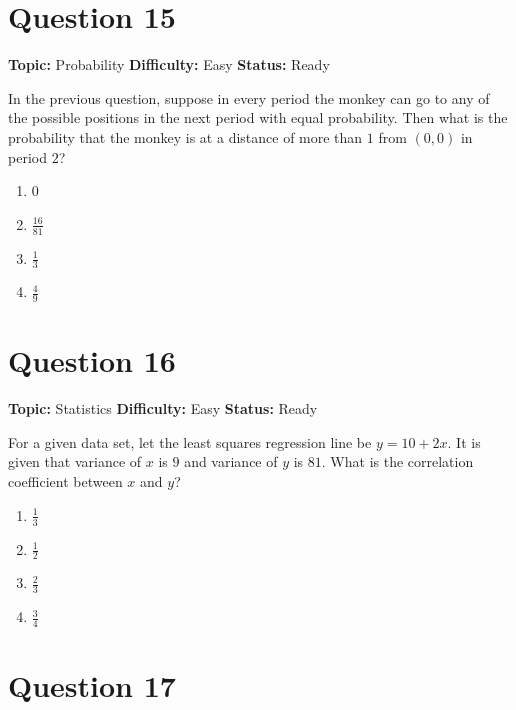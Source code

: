 \documentclass[11pt]{article}
\begin{document}
\newpage

\section*{Question 15}


\noindent\textbf{Topic:} Probability \quad \textbf{Difficulty:} Easy \quad \textbf{Status:} Ready



In the previous question, suppose in every period the monkey can go to any of the possible positions in the next period with equal probability. Then what is the probability that the monkey is at a distance of more than $1$ from $(0,0)$ in period $2$?
\begin{enumerate}[label=(\Alph*)]
\item $0$
\item $\tfrac{16}{81}$
\item $\tfrac{1}{3}$
\item $\tfrac{4}{9}$
\end{enumerate}

\newpage

\section*{Question 16}


\noindent\textbf{Topic:} Statistics \quad \textbf{Difficulty:} Easy \quad \textbf{Status:} Ready



For a given data set, let the least squares regression line be $y=10+2x$. It is given that variance of $x$ is $9$ and variance of $y$ is $81$. What is the correlation coefficient between $x$ and $y$?
\begin{enumerate}[label=(\Alph*)]
\item $\tfrac{1}{3}$
\item $\tfrac{1}{2}$
\item $\tfrac{2}{3}$
\item $\tfrac{3}{4}$
\end{enumerate}

\newpage

\section*{Question 17}
\end{document}
